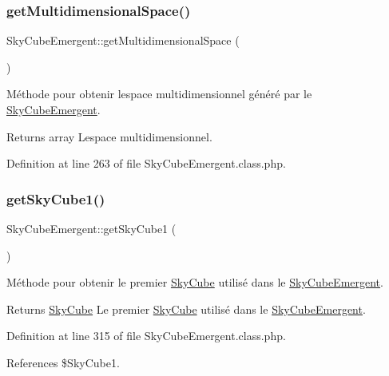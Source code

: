 \subsubsection{\texorpdfstring{get\+Multidimensional\+Space()}{getMultidimensionalSpace()}}
{\footnotesize\ttfamily Sky\+Cube\+Emergent\+::get\+Multidimensional\+Space (\begin{DoxyParamCaption}{ }\end{DoxyParamCaption})}

Méthode pour obtenir l\textquotesingle{}espace multidimensionnel généré par le \hyperlink{class_sky_cube_emergent}{Sky\+Cube\+Emergent}.

\begin{DoxyReturn}{Returns}
array L\textquotesingle{}espace multidimensionnel. 
\end{DoxyReturn}


Definition at line 263 of file Sky\+Cube\+Emergent.\+class.\+php.

\mbox{\label{class_sky_cube_emergent_abadefcec9918f46ec90c89d00a056a69}} 
\subsubsection{\texorpdfstring{get\+Sky\+Cube1()}{getSkyCube1()}}
{\footnotesize\ttfamily Sky\+Cube\+Emergent\+::get\+Sky\+Cube1 (\begin{DoxyParamCaption}{ }\end{DoxyParamCaption})}

Méthode pour obtenir le premier \hyperlink{class_sky_cube}{Sky\+Cube} utilisé dans le \hyperlink{class_sky_cube_emergent}{Sky\+Cube\+Emergent}.

\begin{DoxyReturn}{Returns}
\hyperlink{class_sky_cube}{Sky\+Cube} Le premier \hyperlink{class_sky_cube}{Sky\+Cube} utilisé dans le \hyperlink{class_sky_cube_emergent}{Sky\+Cube\+Emergent}. 
\end{DoxyReturn}


Definition at line 315 of file Sky\+Cube\+Emergent.\+class.\+php.



References \$\+Sky\+Cube1.

\mbox{\label{class_sky_cube_emergent_a28db7414d829b6678c1c662dc6eba875}} 
